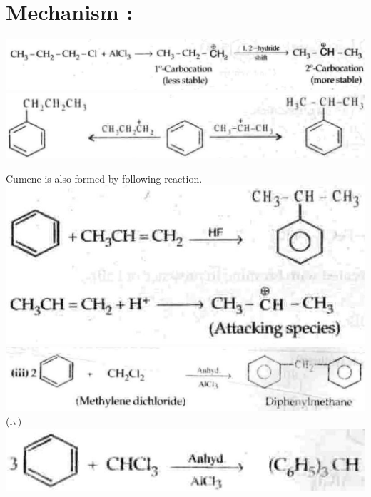 \documentclass[10pt]{article}
\begin{document}
\section*{Mechanism :}
\includegraphics[max width=\textwidth, center]{2025_01_28_8470952b98110cec3aabg-208(4)}\\
\includegraphics[max width=\textwidth, center]{2025_01_28_8470952b98110cec3aabg-208(3)}

Cumene is also formed by following reaction.\\
\includegraphics[max width=\textwidth, center]{2025_01_28_8470952b98110cec3aabg-208(5)}\\
\includegraphics[max width=\textwidth, center]{2025_01_28_8470952b98110cec3aabg-209(5)}\\
(iv)\\
\includegraphics[max width=\textwidth, center]{2025_01_28_8470952b98110cec3aabg-209}
\end{document}

